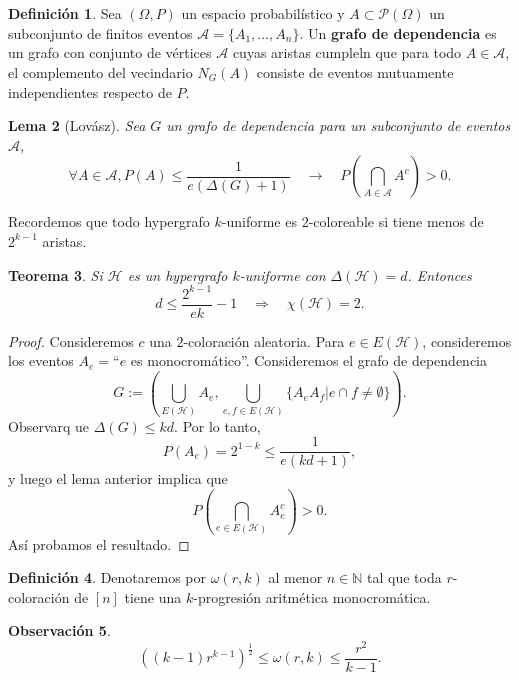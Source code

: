 \documentclass[12pt]{report}
\theoremstyle{plain}
\newtheorem{theorem}{Teorema}[section]
\newtheorem{lemma}[theorem]{Lema}
\theoremstyle{definition}
\newtheorem{definition}[theorem]{Definición}
\newtheorem{obs}[theorem]{Observación}
\newcommand{\naturals}{\mathbb{N}}
\begin{document}
\section{}

\begin{definition}
Sea $(\Omega, P)$ un espacio probabilístico y $A \subset \mathcal P (\Omega)$ un subconjunto de finitos eventos $\mathcal A = \{A_1, \ldots, A_n\}$. Un \textbf{grafo de dependencia} es un grafo con conjunto de vértices $\mathcal A$ cuyas aristas cumpleln que para todo $A\in \mathcal A$, el complemento del vecindario $N_G (A)$ consiste de eventos mutuamente independientes respecto de $P$.
\end{definition}

\begin{lemma}[Lovász]\label{lema:lovasz sobre grafo de dependencia}
Sea $G$ un grafo de dependencia para un subconjunto de eventos $\mathcal A$,
\[
    \forall A \in \mathcal A , P(A) \leq \frac{1}{e (\Delta (G) + 1)} \quad \longrightarrow \quad P(\bigcap_{A \in \mathcal A} A^c) > 0.
\]
\end{lemma}

Recordemos que todo hypergrafo $k$-uniforme es $2$-coloreable si tiene menos de $2^{k-1}$ aristas.

\begin{theorem}
Si $\mathcal H$ es un hypergrafo $k$-uniforme con $\Delta (\mathcal H) =d$. Entonces
\[
    d \leq \frac{2^{k-1}}{ek} -1 \quad \Rightarrow \quad \chi (\mathcal H) = 2.
\]
\end{theorem}
\begin{proof}
Consideremos $c$ una $2$-coloración aleatoria. Para $e \in E(\mathcal H)$, consideremos los eventos $A_e = $``$e$ es monocromático''. Consideremos el grafo de dependencia
\[
    G := \left ( \bigcup_{E (\mathcal H)} A_e, \bigcup_{e,f \in E(\mathcal H)} \{ A_e A_f | e \cap f \neq \emptyset \}\right ).
\]
Observarq ue $\Delta (G) \leq kd$. Por lo tanto,
\[
    P(A_e) = 2^{1-k} \leq \frac{1}{e (kd + 1)},
\]
y luego el lema anterior implica que
\[
    P (\bigcap_{e \in E (\mathcal H)} A_e^c) >0.
\]
Así probamos el resultado.
\end{proof}


\begin{definition}
Denotaremos por $\omega (r,k)$ al menor $n \in \naturals$ tal que toda $r$-coloración de $[n]$ tiene una $k$-progresión aritmética monocromática.
\end{definition}

\begin{obs}
\[
    \left ( (k-1) r^{k-1} \right )^{\frac 1 2} \leq \omega (r,k) \leq \frac{r^2}{k-1}.
\]
\end{obs}
\end{document}
